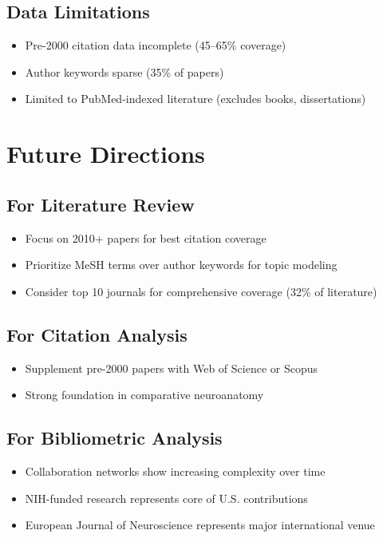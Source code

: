 \documentclass{../latex/analysis_report}
\begin{document}
\subsection{Data Limitations}
\begin{itemize}[noitemsep]
    \item Pre-2000 citation data incomplete (45--65\% coverage)
    \item Author keywords sparse (35\% of papers)
    \item Limited to PubMed-indexed literature (excludes books, dissertations)
\end{itemize}

\section{Future Directions}

\subsection{For Literature Review}
\begin{itemize}[noitemsep]
    \item Focus on 2010+ papers for best citation coverage
    \item Prioritize MeSH terms over author keywords for topic modeling
    \item Consider top 10 journals for comprehensive coverage (32\% of literature)
\end{itemize}

\subsection{For Citation Analysis}
\begin{itemize}[noitemsep]
    \item Supplement pre-2000 papers with Web of Science or Scopus
    \item Strong foundation in comparative neuroanatomy
\end{itemize}

\subsection{For Bibliometric Analysis}
\begin{itemize}[noitemsep]
    \item Collaboration networks show increasing complexity over time
    \item NIH-funded research represents core of U.S. contributions
    \item European Journal of Neuroscience represents major international venue
\end{itemize}
\end{document}
